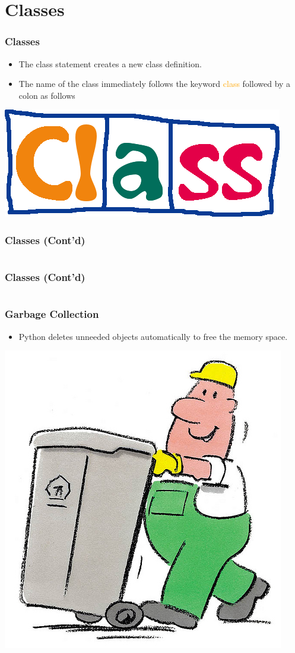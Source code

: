 \documentclass{../py-lecture}
\begin{document}
\section{Classes}

\begin{frame}
	\frametitle{Classes}
  \begin{itemize}
    \item The class statement creates a new class definition.
    \item The name of the class immediately follows the keyword \textcolor{Orange}{class}
    followed by a colon as follows
  \end{itemize}
	\centering \includegraphics[width=.3\textwidth]{img/class.jpg}
\end{frame}

\begin{frame}[fragile]
	\frametitle{Classes (Cont'd)}
  \inputminted[bgcolor=Black,fontsize=\scriptsize,lastline=18]{python}{./src/employee.py}
\end{frame}

\begin{frame}[fragile]
	\frametitle{Classes (Cont'd)}
  \inputminted[bgcolor=Black,fontsize=\scriptsize,firstline=19]{python}{./src/employee.py}
\end{frame}

\begin{frame}
	\frametitle{Garbage Collection}
  \begin{itemize}
    \item Python deletes unneeded objects automatically to free the memory space.
  \end{itemize}
	\centering \includegraphics[width=.4\textwidth]{img/garbage.jpg}
\end{frame}
\end{document}
